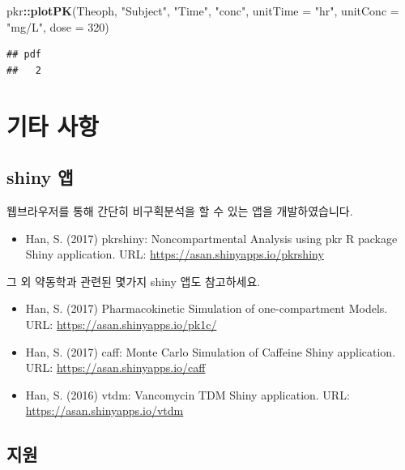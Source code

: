 \documentclass[9pt,]{krantz}
\newenvironment{Shaded}{\begin{snugshade}}{\end{snugshade}}
\newcommand{\KeywordTok}[1]{\textcolor[rgb]{0.13,0.29,0.53}{\textbf{#1}}}
\newcommand{\DataTypeTok}[1]{\textcolor[rgb]{0.13,0.29,0.53}{#1}}
\newcommand{\DecValTok}[1]{\textcolor[rgb]{0.00,0.00,0.81}{#1}}
\newcommand{\StringTok}[1]{\textcolor[rgb]{0.31,0.60,0.02}{#1}}
\newcommand{\OperatorTok}[1]{\textcolor[rgb]{0.81,0.36,0.00}{\textbf{#1}}}
\newcommand{\NormalTok}[1]{#1}
\providecommand{\tightlist}{%
  \setlength{\itemsep}{0pt}\setlength{\parskip}{0pt}}
\begin{document}
\begin{Shaded}
\begin{Highlighting}[]
\NormalTok{pkr}\OperatorTok{::}\KeywordTok{plotPK}\NormalTok{(Theoph, }\StringTok{"Subject"}\NormalTok{, }\StringTok{"Time"}\NormalTok{, }\StringTok{"conc"}\NormalTok{, }
            \DataTypeTok{unitTime =} \StringTok{"hr"}\NormalTok{, }\DataTypeTok{unitConc =} \StringTok{"mg/L"}\NormalTok{, }\DataTypeTok{dose =} \DecValTok{320}\NormalTok{)}
\end{Highlighting}
\end{Shaded}

\begin{verbatim}
## pdf 
##   2
\end{verbatim}

\chapter{기타 사항}\label{etc}

\section{shiny 앱}\label{shiny-}

웹브라우저를 통해 간단히 비구획분석을 할 수 있는 앱을 개발하였습니다.

\begin{itemize}
\tightlist
\item
  Han, S. (2017) pkrshiny: Noncompartmental Analysis using pkr R package
  Shiny application. URL: \url{https://asan.shinyapps.io/pkrshiny}
\end{itemize}

그 외 약동학과 관련된 몇가지 shiny 앱도 참고하세요.

\begin{itemize}
\tightlist
\item
  Han, S. (2017) Pharmacokinetic Simulation of one-compartment Models.
  URL: \url{https://asan.shinyapps.io/pk1c/}
\item
  Han, S. (2017) caff: Monte Carlo Simulation of Caffeine Shiny
  application. URL: \url{https://asan.shinyapps.io/caff}
\item
  Han, S. (2016) vtdm: Vancomycin TDM Shiny application. URL:
  \url{https://asan.shinyapps.io/vtdm}
\end{itemize}

\section{지원}
\end{document}
